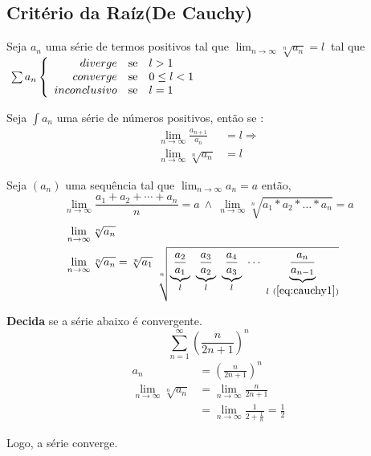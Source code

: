 \documentclass[12pt,openany]{book}
\begin{document}
\subsection{Critério da Raíz(De Cauchy)}

\hspace{5mm} Seja $a_n$ uma série de termos positivos tal que $\displaystyle{\lim_{n \rightarrow \infty} \sqrt[n]{a_n} = l}\  $ tal que $\ \sum a_n  \left\{ \begin{array}{rlll}
diverge & \hbox{se} &  l > 1 \\
converge & \hbox{se} & 0 \leq l < 1 \\
inconclusivo & \hbox{se} & l = 1 \\
\end{array}\right.$

Seja $\int a_n$ uma série de números positivos, então se :
\begin{align}
\lim_{n \rightarrow \infty} \frac{a_{n+1}}{a_n} &= l \Rightarrow \label{eq:cauchy1} \\
\lim_{n \rightarrow \infty} \sqrt[n]{a_n} &= l
\end{align}

Seja $(a_n)$ uma sequência tal que $\displaystyle{\lim_{n \rightarrow \infty} a_n = a}$ então,  $$\lim_{n \rightarrow \infty} \frac{a_1 + a_2 + \cdots + a_n}{n} = a \ \land \ \lim_{n \rightarrow \infty} \sqrt[n]{a_1 * a_2 * \hdots * a_n} = a$$
\begin{align*}
\lim_{n \rightarrow \infty} \sqrt[n]{a_n} \\
\lim_{n \rightarrow \infty} \sqrt[n]{a_n} &= \sqrt[n]{a_1} \ \sqrt[n]{\underbrace{\frac{a_2}{a_1}}_l\ \underbrace{\frac{a_3}{a_2}}_l \ \underbrace{\frac{a_4}{a_3}}_l \ \cdots \ \underbrace{\frac{a_n}{a_{n-1}}}_{l \ (\ref{eq:cauchy1})}}
\end{align*}

\textbf{Decida} se a série abaixo é convergente. $$\sum_{n = 1}^{\infty} \left( \frac{n}{2n+1}\right)^n$$
\begin{align*}
a_n &= \left( \frac{n}{2n+1}\right)^n \\
\lim_{n \rightarrow \infty} \sqrt[n]{a_n} &= \lim_{n \rightarrow \infty}\frac{n}{2n+1} \\
&= \lim_{n \rightarrow \infty}\frac{1}{2+\frac{1}{n}} = \frac{1}{2}
\end{align*}

Logo, a série converge.
\end{document}
